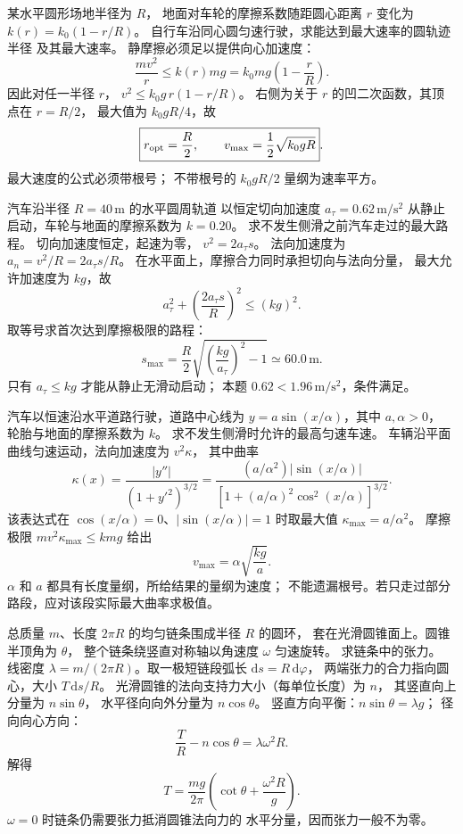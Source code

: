 某水平圆形场地半径为 $R$，
地面对车轮的摩擦系数随距圆心距离 $r$ 变化为
$k(r)=k_0(1-r/R)$。
自行车沿同心圆匀速行驶，求能达到最大速率的圆轨迹半径
及其最大速率。
\exsolution
静摩擦必须足以提供向心加速度：
\[
\frac{mv^2}{r}\le k(r)mg
=k_0mg\left(1-\frac rR\right).
\]
因此对任一半径 $r$，
$v^2\le k_0g\,r(1-r/R)$。
右侧为关于 $r$ 的凹二次函数，其顶点在 $r=R/2$，
最大值为 $k_0gR/4$，故
\[
\boxed{r_{\rm opt}=\frac R2,\qquad
v_{\max}=\frac12\sqrt{k_0gR}}.
\]
\excheck 最大速度的公式必须带根号；
不带根号的 $k_0gR/2$ 量纲为速率平方。

汽车沿半径 $R=40\,\mathrm m$ 的水平圆周轨道
以恒定切向加速度 $a_\tau=0.62\,\mathrm{m/s^2}$
从静止启动，车轮与地面的摩擦系数为 $k=0.20$。
求不发生侧滑之前汽车走过的最大路程。
\exsolution
切向加速度恒定，起速为零，
$v^2=2a_\tau s$。
法向加速度为 $a_n=v^2/R=2a_\tau s/R$。
在水平面上，摩擦合力同时承担切向与法向分量，
最大允许加速度为 $kg$，故
\[
a_\tau^2+\left(\frac{2a_\tau s}{R}\right)^2\le (kg)^2.
\]
取等号求首次达到摩擦极限的路程：
\[
\boxed{s_{\max}=\frac R2
\sqrt{\left(\frac{kg}{a_\tau}\right)^2-1}
\simeq60.0\,\mathrm m}.
\]
\excheck 只有 $a_\tau\le kg$ 才能从静止无滑动启动；
本题 $0.62<1.96\,\mathrm{m/s^2}$，条件满足。

汽车以恒速沿水平道路行驶，道路中心线为
$y=a\sin(x/\alpha)$，其中 $a,\alpha>0$，
轮胎与地面的摩擦系数为 $k$。
求不发生侧滑时允许的最高匀速车速。
\exsolution
车辆沿平面曲线匀速运动，法向加速度为 $v^2\kappa$，
其中曲率
\[
\kappa(x)=\frac{|y''|}{(1+y'^2)^{3/2}}
=\frac{(a/\alpha^2)|\sin(x/\alpha)|}
{[1+(a/\alpha)^2\cos^2(x/\alpha)]^{3/2}}.
\]
该表达式在 $\cos(x/\alpha)=0$、$|\sin(x/\alpha)|=1$
时取最大值 $\kappa_{\max}=a/\alpha^2$。
摩擦极限 $mv^2\kappa_{\max}\le kmg$ 给出
\[
\boxed{v_{\max}=\alpha\sqrt{\frac{kg}{a}}}.
\]
\excheck $\alpha$ 和 $a$ 都具有长度量纲，所给结果的量纲为速度；
不能遗漏根号。若只走过部分路段，应对该段实际最大曲率求极值。

总质量 $m$、长度 $2\pi R$ 的均匀链条围成半径 $R$ 的圆环，
套在光滑圆锥面上。圆锥半顶角为 $\theta$，
整个链条绕竖直对称轴以角速度 $\omega$ 匀速旋转。
求链条中的张力。
\exsolution
线密度 $\lambda=m/(2\pi R)$。取一极短链段弧长
$\mathrm ds=R\,\mathrm d\varphi$，
两端张力的合力指向圆心，大小
$T\,\mathrm ds/R$。
光滑圆锥的法向支持力大小（每单位长度）为 $n$，
其竖直向上分量为 $n\sin\theta$，
水平径向向外分量为 $n\cos\theta$。
竖直方向平衡：$n\sin\theta=\lambda g$；
径向向心方向：
\[
\frac TR-n\cos\theta=\lambda\omega^2R.
\]
解得
\[
\boxed{T=\frac{mg}{2\pi}
\left(\cot\theta+\frac{\omega^2R}{g}\right)}.
\]
\excheck $\omega=0$ 时链条仍需要张力抵消圆锥法向力的
水平分量，因而张力一般不为零。


